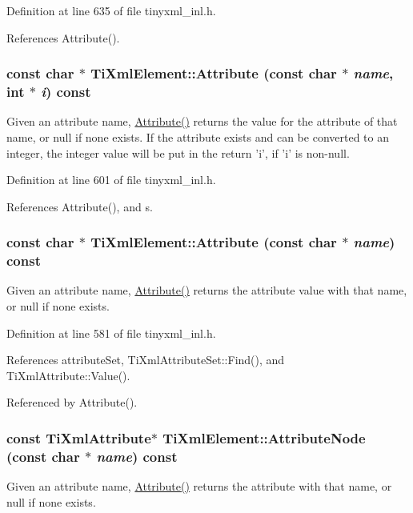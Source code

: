 Definition at line 635 of file tinyxml\_\-inl.h.

References Attribute().\hypertarget{class_ti_xml_element_aa9192e80567b5042dbded80b78c44339}{
\subsubsection[{Attribute}]{\setlength{\rightskip}{0pt plus 5cm}const char $\ast$ TiXmlElement::Attribute (const char $\ast$ {\em name}, \/  int $\ast$ {\em i}) const}}
\label{class_ti_xml_element_aa9192e80567b5042dbded80b78c44339}
Given an attribute name, \hyperlink{class_ti_xml_element_ac1e4691e9375ba4e665dce7e46a50a9c}{Attribute()} returns the value for the attribute of that name, or null if none exists. If the attribute exists and can be converted to an integer, the integer value will be put in the return 'i', if 'i' is non-\/null. 

Definition at line 601 of file tinyxml\_\-inl.h.

References Attribute(), and s.\hypertarget{class_ti_xml_element_ac1e4691e9375ba4e665dce7e46a50a9c}{
\subsubsection[{Attribute}]{\setlength{\rightskip}{0pt plus 5cm}const char $\ast$ TiXmlElement::Attribute (const char $\ast$ {\em name}) const}}
\label{class_ti_xml_element_ac1e4691e9375ba4e665dce7e46a50a9c}
Given an attribute name, \hyperlink{class_ti_xml_element_ac1e4691e9375ba4e665dce7e46a50a9c}{Attribute()} returns the attribute value with that name, or null if none exists. 

Definition at line 581 of file tinyxml\_\-inl.h.

References attributeSet, TiXmlAttributeSet::Find(), and TiXmlAttribute::Value().

Referenced by Attribute().\hypertarget{class_ti_xml_element_a7810143e64e8a1d2ba278cdc79946eb1}{
\subsubsection[{AttributeNode}]{\setlength{\rightskip}{0pt plus 5cm}const {\bf TiXmlAttribute}$\ast$ TiXmlElement::AttributeNode (const char $\ast$ {\em name}) const}}
\label{class_ti_xml_element_a7810143e64e8a1d2ba278cdc79946eb1}
Given an attribute name, \hyperlink{class_ti_xml_element_ac1e4691e9375ba4e665dce7e46a50a9c}{Attribute()} returns the attribute with that name, or null if none exists. 

